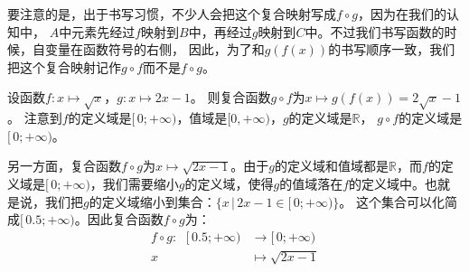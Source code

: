 \documentclass[12pt,UTF8,fontset=none]{ctexbook}
\begin{document}
要注意的是，出于书写习惯，不少人会把这个复合映射写成$f\circ g$，因为在我们的认知中，
$A$中元素先经过$f$映射到$B$中，再经过$g$映射到$C$中。不过我们书写函数的时候，自变量在函数符号的右侧，
因此，为了和$g(f(x))$的书写顺序一致，我们把这个复合映射记作$g\circ f$而不是$f\circ g$。

设函数$f:x\mapsto \sqrt{x}$，$g:x\mapsto 2x - 1$。
则复合函数$g\circ f$为$x\mapsto g(f(x)) = 2\sqrt{x} - 1$。
注意到$f$的定义域是$[\,0;+\infty)$，值域是$[0, +\infty)$，$g$的定义域是$\mathbb{R}$，
$g\circ f$的定义域是$[\,0; +\infty)$。

另一方面，复合函数$f\circ g$为$x\mapsto \sqrt{2x - 1}$。由于$g$的定义域和值域都是$\mathbb{R}$，而$f$的定义域是$[\,0; +\infty)$，我们需要缩小$g$的定义域，使得$g$的值域落在$f$的定义域中。也就是说，我们把$g$的定义域缩小到集合：$\{x \,|\, 2x - 1 \in [\,0;+\infty)\}$。
这个集合可以化简成$[\,0.5;+\infty)$。因此复合函数$f\circ g$为：
\begin{align*}
    f\circ g : \;\,\, [\,0.5; +\infty) &\rightarrow [\,0; +\infty)  \\
    x &\mapsto \sqrt{2x - 1} 
\end{align*}
\end{document}

